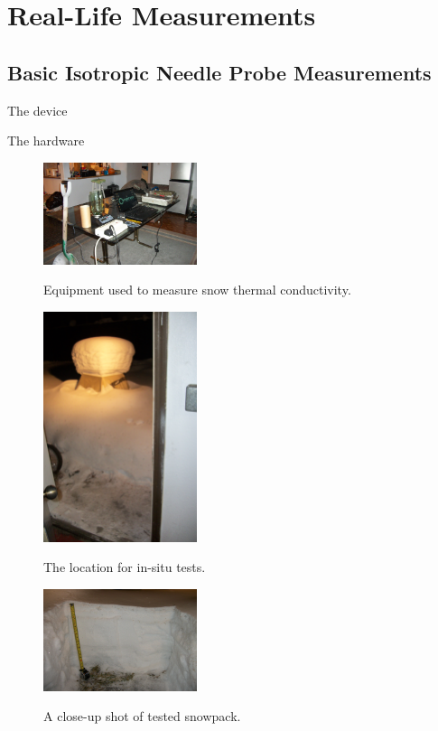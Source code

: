 \chapter{Real-Life Measurements}

\section{Basic Isotropic Needle Probe Measurements}

The device

The hardware

\begin{figure}[h]
\centering
\includegraphics[width=0.4\textwidth]{fig/equipment.jpg}
\label{fig:equipment}
\caption{Equipment used to measure snow thermal conductivity.}
\end{figure}

\begin{figure}[h]
\centering
\includegraphics[width=0.4\textwidth]{fig/insitu_location.jpg}
\label{fig:insitu_location}
\caption{The location for in-situ tests.}
\end{figure}

\begin{figure}[h]
\centering
\includegraphics[width=0.4\textwidth]{fig/snowpack.jpg}
\label{fig:snowpack}
\caption{A close-up shot of tested snowpack.}
\end{figure}

